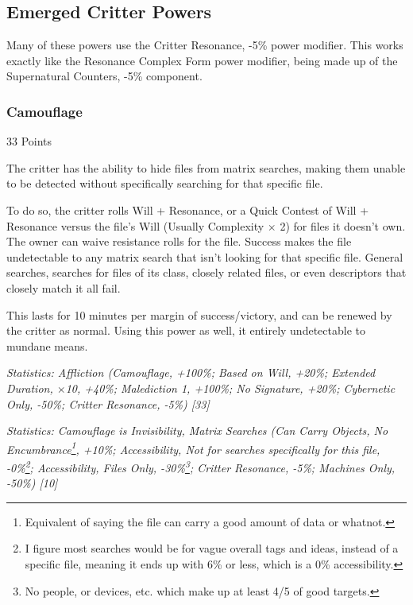 \begin{multicols*}{3}
	\subsection{Emerged Critter Powers}
	
	Many of these powers use the Critter Resonance, -5\% power modifier. This works exactly like the Resonance Complex Form power modifier, being made up of the Supernatural Counters, -5\% component.
	
	\subsubsection{Camouflage}\label{camouflage}
	\begin{flushright}
		33 Points
	\end{flushright}

	The critter has the ability to hide files from matrix searches, making them unable to be detected without specifically searching for that specific file.
	
	To do so, the critter rolls Will + Resonance, or a Quick Contest of Will + Resonance versus the file's Will (Usually Complexity $\times$ 2) for files it doesn't own. The owner can waive resistance rolls for the file. Success makes the file undetectable to any matrix search that isn't looking for that specific file. General searches, searches for files of its class, closely related files, or even descriptors that closely match it all fail.
	
	This lasts for 10 minutes per margin of success/victory, and can be renewed by the critter as normal. Using this power as well, it entirely undetectable to mundane means.

	\textcolor{OliveGreen}{\textit{Statistics: Affliction (Camouflage, +100\%; Based on Will, +20\%; Extended Duration, $\times$10, +40\%; Malediction 1, +100\%; No Signature, +20\%; Cybernetic Only, -50\%; Critter Resonance, -5\%) [33]}}
	
	\textcolor{OliveGreen}{\textit{Statistics: Camouflage is Invisibility, Matrix Searches (Can Carry Objects, No Encumbrance\footnote{Equivalent of saying the file can carry a good amount of data or whatnot.}, +10\%; Accessibility, Not for searches specifically for this file, -0\%\footnote{I figure most searches would be for vague overall tags and ideas, instead of a specific file, meaning it ends up with 6\% or less, which is a 0\% accessibility.}; Accessibility, Files Only, -30\%\footnote{No people, or devices, etc. which make up at least 4/5 of good targets.}; Critter Resonance, -5\%; Machines Only, -50\%) [10] }}
	 

\end{multicols*}
